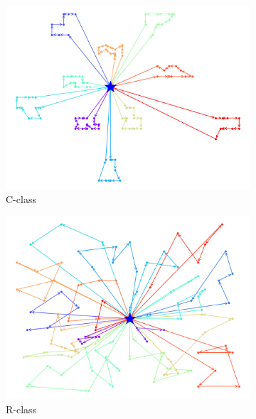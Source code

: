 \begin{figure}[H] %
  \label{fig:perf_ct_c1}
  \begin{subfigure}{.3\textwidth}
    \centering
    \includegraphics[width=1\linewidth]{figures/routes_c101.png}
    \caption{C-class}
    \label{fig:route_c}
  \end{subfigure}%
  \begin{subfigure}{.3\textwidth}
    \centering
    \includegraphics[width=1\linewidth]{figures/routes_r101.png}
    \caption{R-class}
    \label{fig:route_r}
  \end{subfigure}
  \begin{subfigure}{.3\textwidth}
    \centering

\end{subfigure}
\end{figure}
